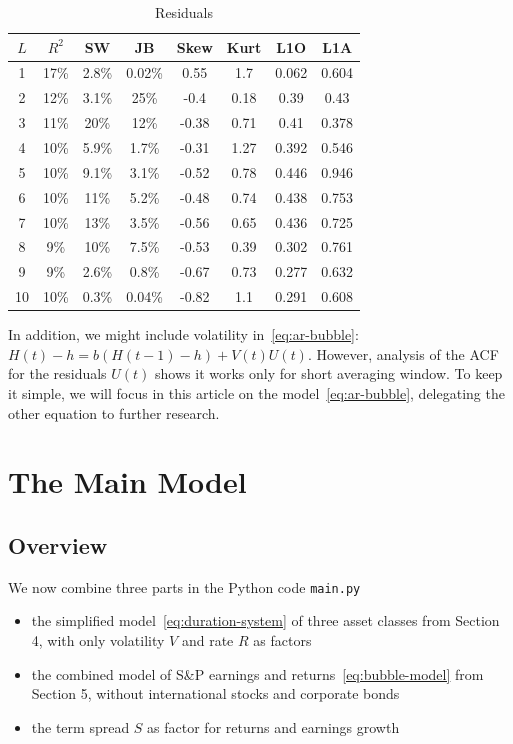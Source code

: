 \documentclass[12pt]{amsart}
\begin{document}
\begin{table}[h]
\centering
\begin{tabular}{|cccccccc|}
\hline
$L$ & $R^2$ & SW & JB & Skew & Kurt & L1O & L1A \\
\hline
1 & 17\% & 2.8\% & 0.02\% & 0.55 & 1.7 & 0.062 & 0.604 \\
2 & 12\% & 3.1\% & 25\% & -0.4 & 0.18 & 0.39 & 0.43 \\
3 & 11\% & 20\% & 12\% & -0.38 & 0.71 & 0.41 & 0.378\\
4 & 10\% & 5.9\% & 1.7\% & -0.31 & 1.27 & 0.392 & 0.546\\
5 & 10\% & 9.1\% & 3.1\% & -0.52 & 0.78 & 0.446 & 0.946\\
6 & 10\% & 11\% & 5.2\% & -0.48 & 0.74 & 0.438 & 0.753\\
7 & 10\% & 13\% & 3.5\% & -0.56 & 0.65 & 0.436 & 0.725\\
8 & 9\% & 10\% & 7.5\% & -0.53 & 0.39 & 0.302 & 0.761\\
9 & 9\% & 2.6\% & 0.8\% & -0.67 & 0.73 & 0.277 & 0.632\\
10 & 10\% & 0.3\% & 0.04\% & -0.82 & 1.1 & 0.291 & 0.608\\
\hline
\end{tabular}
\bigskip
\caption{Residuals}
\label{table:selection}
\end{table}

In addition, we might include volatility in~\eqref{eq:ar-bubble}: $H(t) - h = b(H(t-1) - h) + V(t)U(t)$. However, analysis of the ACF for the residuals $U(t)$ shows it works only for short averaging window. To keep it simple, we will focus in this article on the model~\eqref{eq:ar-bubble}, delegating the other equation to further research. 


\section{The Main Model}

\subsection{Overview} We now combine three parts in the Python code \texttt{main.py}

\begin{itemize}
\item the simplified model~\eqref{eq:duration-system} of three asset classes from Section 4, with only volatility $V$ and rate $R$ as factors
\item the combined model of S\&P earnings and returns~\eqref{eq:bubble-model} from Section 5, without international stocks and corporate bonds
\item the term spread $S$ as factor for returns and earnings growth
\end{itemize}
\end{document}
